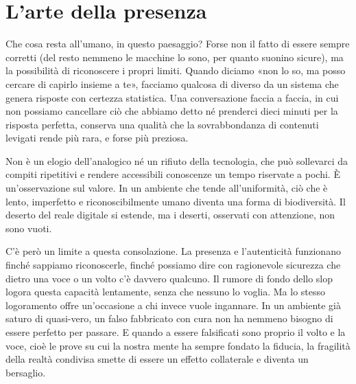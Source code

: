 \section{L'arte della presenza}

Che cosa resta all'umano, in questo paesaggio? Forse non il fatto di essere sempre corretti (del resto nemmeno le macchine lo sono, per quanto suonino sicure), ma la possibilità di riconoscere i propri limiti. Quando diciamo «non lo so, ma posso cercare di capirlo insieme a te», facciamo qualcosa di diverso da un sistema che genera risposte con certezza statistica. Una conversazione faccia a faccia, in cui non possiamo cancellare ciò che abbiamo detto né prenderci dieci minuti per la risposta perfetta, conserva una qualità che la sovrabbondanza di contenuti levigati rende più rara, e forse più preziosa.

Non è un elogio dell'analogico né un rifiuto della tecnologia, che può sollevarci da compiti ripetitivi e rendere accessibili conoscenze un tempo riservate a pochi. È un'osservazione sul valore. In un ambiente che tende all'uniformità, ciò che è lento, imperfetto e riconoscibilmente umano diventa una forma di biodiversità. Il deserto del reale digitale si estende, ma i deserti, osservati con attenzione, non sono vuoti.

C'è però un limite a questa consolazione. La presenza e l'autenticità funzionano finché sappiamo riconoscerle, finché possiamo dire con ragionevole sicurezza che dietro una voce o un volto c'è davvero qualcuno. Il rumore di fondo dello slop logora questa capacità lentamente, senza che nessuno lo voglia. Ma lo stesso logoramento offre un'occasione a chi invece vuole ingannare. In un ambiente già saturo di quasi-vero, un falso fabbricato con cura non ha nemmeno bisogno di essere perfetto per passare. E quando a essere falsificati sono proprio il volto e la voce, cioè le prove su cui la nostra mente ha sempre fondato la fiducia, la fragilità della realtà condivisa smette di essere un effetto collaterale e diventa un bersaglio.
